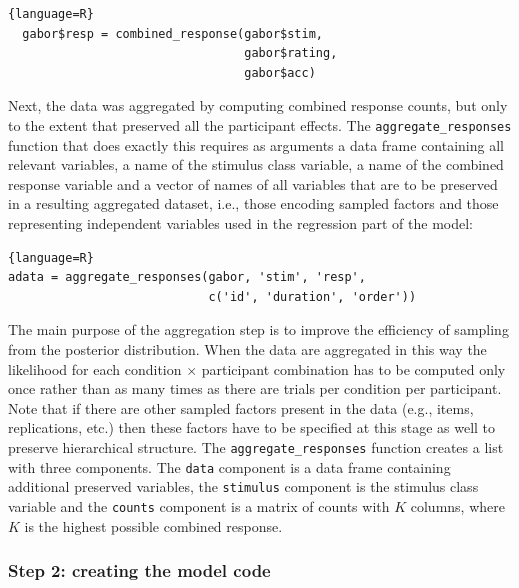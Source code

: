 \documentclass[oneside,a4paper]{article}
\begin{document}
\begin{lstlisting}{language=R}
  gabor$resp = combined_response(gabor$stim, 
                                 gabor$rating, 
                                 gabor$acc)
\end{lstlisting}

Next, the data was aggregated by computing combined response counts,
but only to the extent that preserved all the participant effects. The
\texttt{aggregate\_responses} function that does exactly this requires
as arguments a data frame containing all relevant variables, a name of
the stimulus class variable, a name of the combined response variable
and a vector of names of all variables that are to be preserved in a
resulting aggregated dataset, i.e., those encoding sampled factors and
those representing independent variables used in the regression part
of the model:

\begin{lstlisting}{language=R}
adata = aggregate_responses(gabor, 'stim', 'resp', 
                            c('id', 'duration', 'order'))  
\end{lstlisting}

The main purpose of the aggregation step is to improve the efficiency
of sampling from the posterior distribution. When the data are
aggregated in this way the likelihood for each condition $\times$
participant combination has to be computed only once rather than as
many times as there are trials per condition per participant. Note
that if there are other sampled factors present in the data (e.g.,
items, replications, etc.) then these factors have to be specified at
this stage as well to preserve hierarchical structure. The
\texttt{aggregate\_responses} function creates a list with three
components. The \texttt{data} component is a data frame containing
additional preserved variables, the \texttt{stimulus} component is the
stimulus class variable and the \texttt{counts} component is a matrix
of counts with $K$ columns, where $K$ is the highest possible combined
response.

\subsubsection{Step 2: creating the model code}
\end{document}
